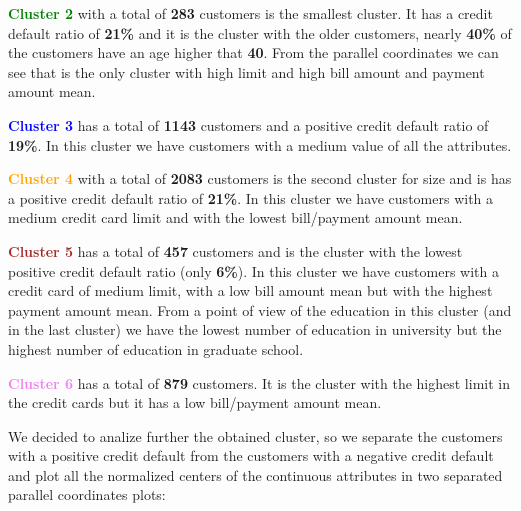\smallskip

\textbf{\textcolor{green}{Cluster 2}} with a total of \textbf{283} customers is the smallest cluster. It has a credit default ratio of \textbf{21\%} and it is the cluster with the older customers, nearly \textbf{40\%} of the customers have an age higher that \textbf{40}. From the parallel coordinates we can see that is the only cluster with high limit and high bill amount and payment amount mean. 

\medskip

\textbf{\textcolor{blue}{Cluster 3}} has a total of \textbf{1143} customers and a positive credit default ratio of \textbf{19\%}. In this cluster we have customers with a medium value of all the attributes.

\medskip

\textbf{\textcolor{orange}{Cluster 4}} with a total of \textbf{2083} customers is the second cluster for size and is has a positive credit default ratio of \textbf{21\%}. In this cluster we have customers with a medium credit card limit and with the lowest bill/payment amount mean.

\medskip

\textbf{\textcolor{brown}{Cluster 5}} has a total of \textbf{457} customers and is the cluster with the lowest positive credit default ratio (only \textbf{6\%}). In this cluster we have customers with a credit card of medium limit, with a low bill amount mean but with the highest payment amount mean. From a point of view of the education in this cluster (and in the last cluster) we have the lowest number of education in university but the highest number of education in graduate school.

\medskip

\textbf{\textcolor{violet}{Cluster 6}} has a total of \textbf{879} customers. It is the cluster with the highest limit in the credit cards but it has a low bill/payment amount mean.

\medskip

We decided to analize further the obtained cluster, so we separate the customers with a positive credit default from the customers with a negative credit default and plot all the normalized centers of the continuous attributes in two separated parallel coordinates plots: 

